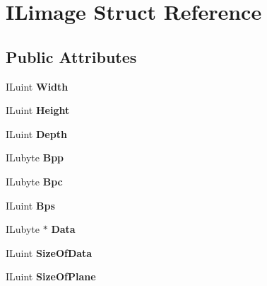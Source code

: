 \hypertarget{structILimage}{
\section{ILimage Struct Reference}
\label{structILimage}
}
\subsection*{Public Attributes}
\begin{DoxyCompactItemize}
\item 
\hypertarget{structILimage_acdaccde79cda12c44c7a076ef9978cf1}{
ILuint {\bfseries Width}}
\label{structILimage_acdaccde79cda12c44c7a076ef9978cf1}

\item 
\hypertarget{structILimage_af0fe112b929d774c723ba5d8b6c2c5da}{
ILuint {\bfseries Height}}
\label{structILimage_af0fe112b929d774c723ba5d8b6c2c5da}

\item 
\hypertarget{structILimage_a00e19fb6f1e50731d114c302129112d9}{
ILuint {\bfseries Depth}}
\label{structILimage_a00e19fb6f1e50731d114c302129112d9}

\item 
\hypertarget{structILimage_a1b3ec86e5bf7087b7d46f0ed61d86eb9}{
ILubyte {\bfseries Bpp}}
\label{structILimage_a1b3ec86e5bf7087b7d46f0ed61d86eb9}

\item 
\hypertarget{structILimage_a20c53053c80d504de93c3ee17290a9ba}{
ILubyte {\bfseries Bpc}}
\label{structILimage_a20c53053c80d504de93c3ee17290a9ba}

\item 
\hypertarget{structILimage_a09ee9478fab289cf2622f06db9171894}{
ILuint {\bfseries Bps}}
\label{structILimage_a09ee9478fab289cf2622f06db9171894}

\item 
\hypertarget{structILimage_ab7a9627719d89abb3cb48087452acbc8}{
ILubyte $\ast$ {\bfseries Data}}
\label{structILimage_ab7a9627719d89abb3cb48087452acbc8}

\item 
\hypertarget{structILimage_a9e84436c94d9cd5afad59be12dff753b}{
ILuint {\bfseries SizeOfData}}
\label{structILimage_a9e84436c94d9cd5afad59be12dff753b}

\item 
\hypertarget{structILimage_a5ce85bc0b983ddf0ed91b1ed98d9132a}{
ILuint {\bfseries SizeOfPlane}}
\label{structILimage_a5ce85bc0b983ddf0ed91b1ed98d9132a}


\end{DoxyCompactItemize}
